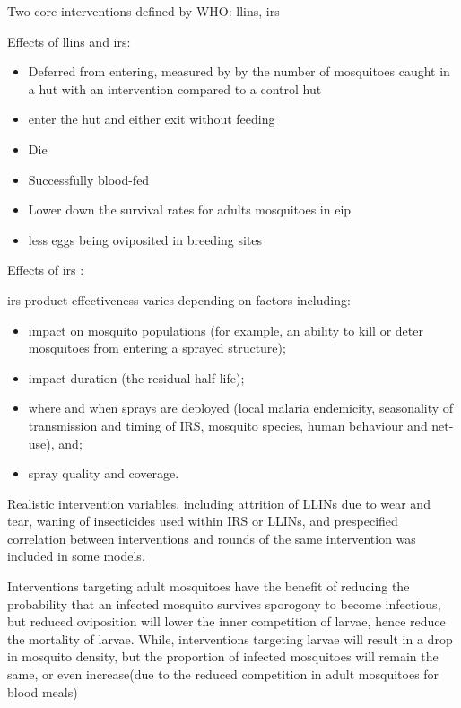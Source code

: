 \documentclass[a4paper, 12pt, twoside]{article}
\begin{document}
Two core interventions defined by WHO: \gls{llins}, \gls{irs}

Effects of \gls{llins} and \gls{irs}:

\begin{itemize}
	\item Deferred from entering, measured by by the number of mosquitoes caught in a hut with an intervention compared to a control hut
	\item enter the hut and either exit without feeding
	\item Die
	\item Successfully blood-fed
	\item Lower down the survival rates for adults mosquitoes in \gls{eip}
	\item less eggs being oviposited in breeding sites
\end{itemize}

Effects of \gls{irs} \cite{Sherrard-Smith2018b}:

\gls{irs} product effectiveness varies depending on factors including:

\begin{itemize}
	\item impact on mosquito populations (for example, an ability to kill or deter mosquitoes from entering a sprayed structure);
	\item impact duration (the residual half-life);
	\item where and when sprays are deployed (local malaria endemicity, seasonality of transmission and timing of IRS, mosquito species, human behaviour and net-use), and;
	\item spray quality and coverage.
\end{itemize}

Realistic intervention variables, including attrition of LLINs due to wear and tear, waning of insecticides used within IRS or LLINs, and prespecified correlation between interventions and rounds of the same intervention was included in some models\cite{Walker2016}.

Interventions targeting adult mosquitoes have the benefit of reducing the probability that an infected mosquito survives sporogony to become infectious, but reduced oviposition will lower the inner competition of larvae, hence reduce the mortality of larvae.
While, interventions targeting larvae will result in a drop in mosquito density, but the proportion of infected mosquitoes will remain the same, or even increase(due to the reduced competition in adult mosquitoes for blood meals)
\end{document}

